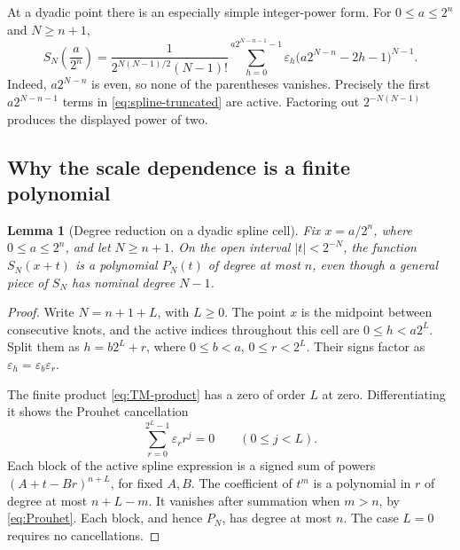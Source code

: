 \documentclass[11pt,a4paper]{article}
\newtheorem{lemma}[theorem]{Lemma}
\theoremstyle{definition}
\theoremstyle{remark}
\newcommand{\eps}{\varepsilon}
\begin{document}
At a dyadic point there is an especially simple integer-power form.
For \(0\leq a\leq2^n\) and \(N\geq n+1\),
\begin{equation}
 \boxed{\displaystyle
 S_N\!\left(\frac a{2^n}\right)
 =\frac{1}{2^{N(N-1)/2}(N-1)!}
       \sum_{h=0}^{a2^{N-n-1}-1}\eps_h
               \bigl(a2^{N-n}-2h-1\bigr)^{N-1}.}       \label{eq:spline-dyadic}
\end{equation}
Indeed, \(a2^{N-n}\) is even, so none of the parentheses vanishes.  Precisely the
first \(a2^{N-n-1}\) terms in \eqref{eq:spline-truncated} are active.  Factoring out
\(2^{-N(N-1)}\) produces the displayed power of two.

\subsection{Why the scale dependence is a finite polynomial}
\begin{lemma}[Degree reduction on a dyadic spline cell]
Fix \(x=a/2^n\), where \(0\leq a\leq2^n\), and let \(N\geq n+1\).
On the open interval \(|t|<2^{-N}\), the function \(S_N(x+t)\) is a polynomial
\(P_N(t)\) of degree at most \(n\), even though a general piece of \(S_N\) has
nominal degree \(N-1\).
\end{lemma}
\begin{proof}
Write \(N=n+1+L\), with \(L\geq0\).  The point \(x\) is the midpoint between
consecutive knots, and the active indices throughout this cell are
\(0\leq h<a2^L\).  Split them as \(h=b2^L+r\), where
\(0\leq b<a\), \(0\leq r<2^L\).  Their signs factor as
\(\eps_h=\eps_b\eps_r\).

The finite product \eqref{eq:TM-product} has a zero of order \(L\) at zero.
Differentiating it shows the Prouhet cancellation
\begin{equation}
 \sum_{r=0}^{2^L-1}\eps_r r^j=0\qquad(0\leq j<L).      \label{eq:Prouhet}
\end{equation}
Each block of the active spline expression is a signed sum of powers
\((A+t-Br)^{n+L}\), for fixed \(A,B\).  The coefficient of \(t^m\) is a polynomial
in \(r\) of degree at most \(n+L-m\).  It vanishes after summation when
\(m>n\), by \eqref{eq:Prouhet}.  Each block, and hence \(P_N\), has degree at most
\(n\).  The case \(L=0\) requires no cancellations.
\end{proof}
\end{document}
